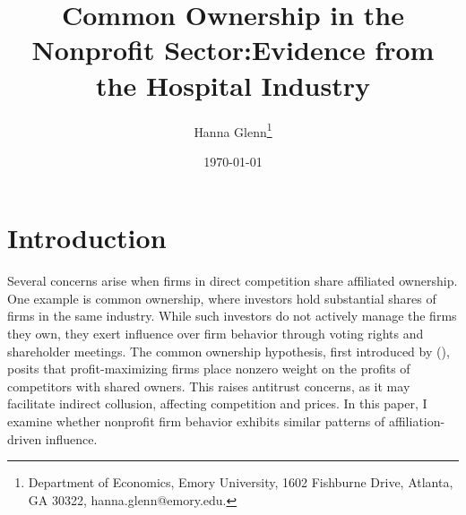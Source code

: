 \documentclass[12pt]{article}
\begin{document}
	
	
	
	
	\linespread{1.2}\title{\vspace{-0.5in} Common Ownership in the Nonprofit Sector:\newline Evidence from the Hospital Industry} 
	
	\date{\today}
	
	\author{\vspace{10mm}Hanna Glenn\footnote{Department of Economics, Emory University, 1602 Fishburne Drive, Atlanta, GA 30322, hanna.glenn@emory.edu.} }
	
	\maketitle
	
	\vspace{-0.2in}
	
	\singlespacing\maketitle


 \vspace{3mm}
	
    \begin{abstract}
		{\small

		} 
	\end{abstract}
	
	
	
	
	

	
	\onehalfspacing
	
	\newpage

    \section{Introduction}

    Several concerns arise when firms in direct competition share affiliated ownership. One example is common ownership, where investors hold substantial shares of firms in the same industry. While such investors do not actively manage the firms they own, they exert influence over firm behavior through voting rights and shareholder meetings. The common ownership hypothesis, first introduced by \citeauthor{rotemberg1984financial} (\citeyear{rotemberg1984financial}), posits that profit-maximizing firms place nonzero weight on the profits of competitors with shared owners. This raises antitrust concerns, as it may facilitate indirect collusion, affecting competition and prices. In this paper, I examine whether nonprofit firm behavior exhibits similar patterns of affiliation-driven influence.
\end{document}
